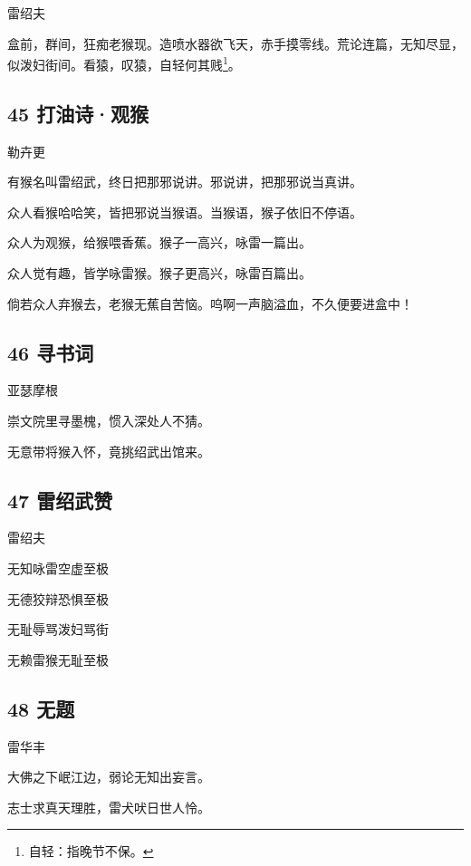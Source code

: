 雷绍夫

盒前，群间，狂痴老猴现。造喷水器欲飞天，赤手摸零线。荒论连篇，无知尽显，似泼妇街间。看猿，叹猿，自轻何其贱\footnote{自轻：指晚节不保。}。

\hypertarget{ux6253ux6cb9ux8bd7ux89c2ux7334}{%
\subsection{45 打油诗·观猴}\label{ux6253ux6cb9ux8bd7ux89c2ux7334}}

勒卉更

有猴名叫雷绍武，终日把那邪说讲。邪说讲，把那邪说当真讲。

众人看猴哈哈笑，皆把邪说当猴语。当猴语，猴子依旧不停语。

众人为观猴，给猴喂香蕉。猴子一高兴，咏雷一篇出。

众人觉有趣，皆学咏雷猴。猴子更高兴，咏雷百篇出。

倘若众人弃猴去，老猴无蕉自苦恼。呜啊一声脑溢血，不久便要进盒中！

\hypertarget{ux5bfbux4e66ux8bcd}{%
\subsection{46 寻书词}\label{ux5bfbux4e66ux8bcd}}

亚瑟摩根

崇文院里寻墨槐，惯入深处人不猜。

无意带将猴入怀，竟挑绍武出馆来。

\hypertarget{ux96f7ux7ecdux6b66ux8d5e}{%
\subsection{47 雷绍武赞}\label{ux96f7ux7ecdux6b66ux8d5e}}

雷绍夫

无知咏雷空虚至极

无德狡辩恐惧至极

无耻辱骂泼妇骂街

无赖雷猴无耻至极

\hypertarget{ux65e0ux9898-11}{%
\subsection{48 无题}\label{ux65e0ux9898-11}}

雷华丰

大佛之下岷江边，弱论无知出妄言。

志士求真天理胜，雷犬吠日世人怜。

